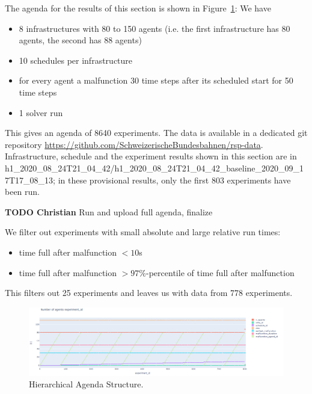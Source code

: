 \documentclass{article}
\begin{document}
The agenda for the results of this section is shown in Figure~\ref{fig:agenda}: We have
\begin{itemize}
    \item 8 infrastructures with 80 to 150 agents (i.e. the first infrastructure has 80 agents, the second has 88 agents)
    \item 10 schedules per infrastructure
    \item for every agent a malfunction 30 time steps after its scheduled start for 50 time steps
    \item 1 solver run
\end{itemize}
This gives an agenda of 8640 experiments.
The data is available in a dedicated git repository \url{https://github.com/SchweizerischeBundesbahnen/rsp-data}.
%
Infrastructure, schedule and the experiment results shown in this section are in
\textrm{h1\_2020\_08\_24T21\_04\_42/h1\_2020\_08\_24T21\_04\_42\_baseline\_2020\_09\_17T17\_08\_13}; in these provisional results, only the first 803 experiments have been run. 

\begin{mdframed}
{\bf TODO Christian} Run and upload full agenda, finalize
\end{mdframed}


We filter out  experiments with small absolute and large relative run times:
\begin{itemize}
    \item time full after malfunction $< 10$s
    \item time full after malfunction $> 97\%$-percentile of time full after malfunction
\end{itemize}
This filters out 25 experiments and leaves us with data from 778 experiments.


\begin{figure}[hbtp]
	
    \includegraphics[width=\textwidth]{Figures/agenda.PNG}
	\caption{Hierarchical Agenda Structure.}
	\label{fig:agenda}
\end{figure}




\end{document}
